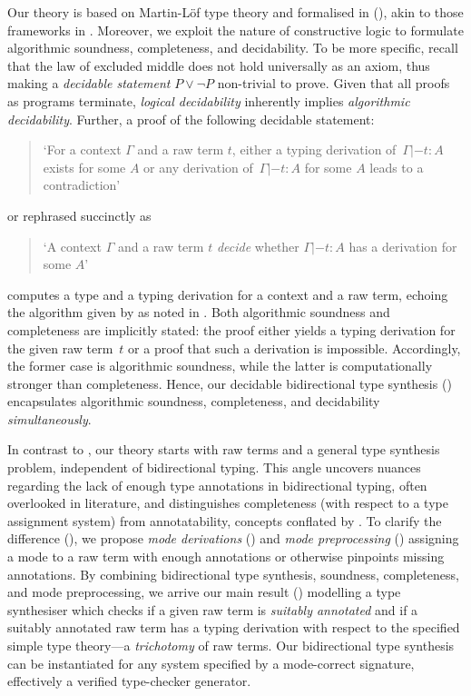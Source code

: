 Our theory is based on Martin-L\"of type theory and formalised in \Agda (), akin to those frameworks in .
Moreover, we exploit the nature of constructive logic to formulate algorithmic soundness, completeness, and decidability. 
To be more specific, recall that the law of excluded middle does not hold universally as an axiom, thus making a \emph{decidable statement} $P \vee \neg P$ non-trivial to prove.
Given that all proofs as programs terminate, \emph{logical decidability} inherently implies \emph{algorithmic decidability}.
Further, a proof of the following decidable statement:
\begin{quote}
  `For a context $\Gamma$ and a raw term $t$, either a typing derivation of\, $\Gamma |- t : A$ exists for some $A$ or any derivation of\, $\Gamma |- t : A$ for some $A$ leads to a contradiction'
\end{quote}
or rephrased succinctly as 
\begin{quote}
  `A context $\Gamma$ and a raw term $t$ \emph{decide} whether $\Gamma |- t : A$ has a derivation for some $A$'
\end{quote}
computes a type and a typing derivation for a context and a raw term, echoing the algorithm given by \citeauthor{Wadler2022} as noted in .
Both algorithmic soundness and completeness are implicitly stated:
the proof either yields a typing derivation for the given raw term~$t$ or a proof that such a derivation is impossible.
Accordingly, the former case is algorithmic soundness, while the latter is computationally stronger than completeness.
Hence, our decidable bidirectional type synthesis () encapsulates algorithmic soundness, completeness, and decidability \emph{simultaneously}. 

In contrast to \citeauthor{Wadler2022}, our theory starts with raw terms and a general type synthesis problem, independent of bidirectional typing.
This angle uncovers nuances regarding the lack of enough type annotations in bidirectional typing, often overlooked in literature, and distinguishes completeness (with respect to a type assignment system) from annotatability, concepts conflated by \citet{Dunfield2021}. 
To clarify the difference (), we propose \emph{mode derivations} () and \emph{mode preprocessing} () assigning a mode to a raw term with enough annotations or otherwise pinpoints missing annotations.
By combining bidirectional type synthesis, soundness, completeness, and mode preprocessing, we arrive our main result () modelling a type synthesiser which checks if a given raw term is \emph{suitably annotated} and if a suitably annotated raw term has a typing derivation with respect to the specified simple type theory---a \emph{trichotomy} of raw terms.
Our bidirectional type synthesis can be instantiated for any system specified by a mode-correct signature, effectively a verified type-checker generator. 

